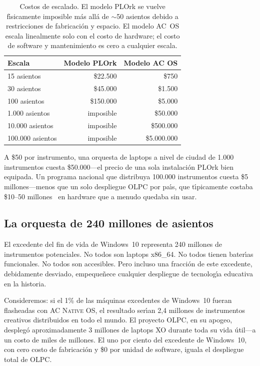 \documentclass[10pt,letterpaper,twocolumn]{article}
\newcommand{\acos}{\textsc{AC Native OS}}
\begin{document}
\begin{table}[h]
\small
\centering
\begin{tabular}{lrr}
\toprule
\textbf{Escala} & \textbf{Modelo PLOrk} & \textbf{Modelo AC OS} \\
\midrule
15 asientos & \$22.500 & \$750 \\
30 asientos & \$45.000 & \$1.500 \\
100 asientos & \$150.000 & \$5.000 \\
1.000 asientos & imposible & \$50.000 \\
10.000 asientos & imposible & \$500.000 \\
100.000 asientos & imposible & \$5.000.000 \\
\bottomrule
\end{tabular}
\caption{Costos de escalado. El modelo PLOrk se vuelve f\'{\i}sicamente imposible m\'{a}s all\'{a} de $\sim$50 asientos debido a restricciones de fabricaci\'{o}n y espacio. El modelo AC~OS escala linealmente solo con el costo de hardware; el costo de software y mantenimiento es cero a cualquier escala.}
\label{tab:scaling}
\end{table}

A \$50 por instrumento, una orquesta de laptops a nivel de ciudad de 1.000 instrumentos cuesta \$50.000---el precio de una sola instalaci\'{o}n PLOrk bien equipada. Un programa nacional que distribuya 100.000 instrumentos cuesta \$5 millones---menos que un solo despliegue OLPC por pa\'{\i}s, que t\'{\i}picamente costaba \$10--50 millones~\citep{kraemer2009olpc} en hardware que a menudo quedaba sin usar.

\subsection{La orquesta de 240 millones de asientos}

El excedente del fin de vida de Windows~10 representa 240 millones de instrumentos potenciales. No todos son laptops x86\_64. No todos tienen bater\'{\i}as funcionales. No todos son accesibles. Pero incluso una fracci\'{o}n de este excedente, debidamente desviado, empeque\~{n}ece cualquier despliegue de tecnolog\'{\i}a educativa en la historia.

Consideremos: si el 1\% de las m\'{a}quinas excedentes de Windows~10 fueran flasheadas con \acos{}, el resultado ser\'{\i}an 2,4 millones de instrumentos creativos distribuidos en todo el mundo. El proyecto OLPC, en su apogeo, despleg\'{o} aproximadamente 3 millones de laptops XO durante toda su vida \'{u}til---a un costo de miles de millones. El uno por ciento del excedente de Windows~10, con cero costo de fabricaci\'{o}n y \$0 por unidad de software, iguala el despliegue total de OLPC.
\end{document}
